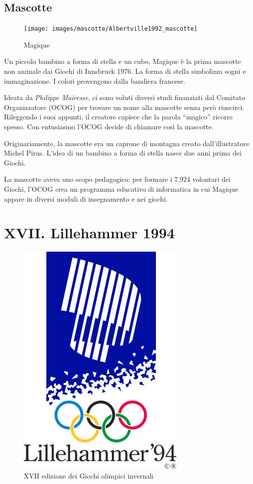 \documentclass[
]{book}
\begin{document}
\section*{Mascotte}\label{mascotte-5}

\begin{figure}
\texttt{[image: images/mascotte/Albertville1992\_mascotte]} \caption{Magique}\label{fig:unnamed-chunk-56}
\end{figure}

Un piccolo bambino a forma di stella e un cubo, Magique è la prima mascotte non animale dai Giochi di Innsbruck 1976. La forma di stella simbolizza sogni e immaginazione. I colori provengono dalla bandiera francese.

Ideata da \emph{Philippe Mairesse}, ci sono voluti diversi studi finanziati dal Comitato Organizzatore (OCOG) per trovare un nome alla mascotte senza però riuscirci. Rileggendo i suoi appunti, il creatore capisce che la parola ``magico'' ricorre spesso. Con entusiasmo l'OCOG decide di chiamare così la mascotte.

Originariamente, la mascotte era un caprone di montagna creato dall'illustratore Michel Pirus. L'idea di un bambino a forma di stella nasce due anni prima dei Giochi.

La mascotte aveva uno scopo pedagogico: per formare i 7.924 volontari dei Giochi, l'OCOG crea un programma educativo di informatica in cui Magique appare in diversi moduli di insegnamento e nei giochi.

\chapter*{XVII. Lillehammer 1994}\label{xvii.-lillehammer-1994}

\begin{figure}
\includegraphics[width=0.4\linewidth]{images/loghi/1994} \caption{XVII edizione dei Giochi olimpici invernali}\label{fig:unnamed-chunk-57}
\end{figure}
\end{document}
